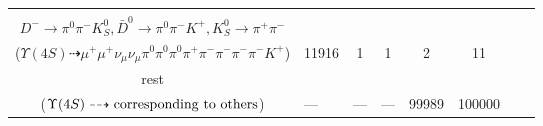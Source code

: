\documentclass[landscape]{article}
\newcounter{rownumbers}
\newcommand\rn{\stepcounter{rownumbers}\arabic{rownumbers}}
\newcommand{\EOLP}{\\ \hline} %
\newcommand{\topoTags}[1]{#1} %
\begin{document}
\begin{longtable}{clcccccc}
\rn & \makecell[l]{ $ 
\Upsilon(4S) \rightarrow B^{0} B^{0} ,
B^{0} \rightarrow \mu^{+} \nu_{\mu} D^{*-} ,
B^{0} \rightarrow \mu^{+} \nu_{\mu} D^{*-} ,
D^{*-} \rightarrow \pi^{0} D^{-} ,
D^{*-} \rightarrow \pi^{-} \bar{D}^{0} ,
$ \\ $
D^{-} \rightarrow \pi^{0} \pi^{-} K_{S}^{0} ,
\bar{D}^{0} \rightarrow \pi^{0} \pi^{-} K^{+} ,
K_{S}^{0} \rightarrow \pi^{+} \pi^{-} 
$ \\ ($
\Upsilon(4S) \dashrightarrow \mu^{+} \mu^{+} \nu_{\mu} \nu_{\mu} \pi^{0} \pi^{0} \pi^{0} \pi^{+} \pi^{-} \pi^{-} \pi^{-} \pi^{-} K^{+} 
$) } & \topoTags{11916 & }1 & 1 & 2 & 11 \EOLP

rest & \makecell[l]{ $ 
\Upsilon(4S) \rightarrow \rm{others \  (99969 \  in \  total)}
$ \\ ($
\Upsilon(4S) \dashrightarrow \rm{corresponding\ to\ others}
$) } & \topoTags{--- & }--- & --- & 99989 & 100000 \\ \hline

\end{longtable}
\end{document}
